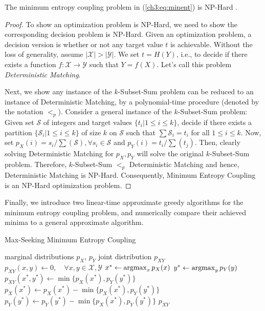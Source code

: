 \begin{remark} The minimum entropy coupling problem in (\ref{ch3:eq:minent}) is NP-Hard \cite{kovavcevic2015entropy}.
\end{remark}
\begin{proof}
To show an optimization problem is NP-Hard, we need to show the corresponding decision problem is NP-Hard.  Given an optimization problem, a decision version is whether or not any target value $t$ is achievable. Without the loss of generality, assume $|\mathcal{X}| > |\mathcal{Y}|$. We set $t=H(Y)$, i.e., to decide if there exists a function $f: \mathcal{X}\to\mathcal{Y}$ such that $Y=f(X)$. Let's call this problem \textit{Deterministic Matching}.

Next, we show any instance of the $k$-Subset-Sum problem can be reduced to an instance of Deterministic Matching, by a polynomial-time procedure (denoted by the notation $<_p$). Consider a general instance of the $k$-Subset-Sum problem: Given set $\mathcal{S}$ of integers and target values $\{t_i|1\leq i\leq k\}$, decide if there exists a partition $\{\mathcal{S}_i|1\leq i\leq k \}$ of size $k$ on $\mathcal{S}$ such that $\sum \mathcal{S}_i = t_i$ for all $1\leq i\leq k$. 
Now, set $p_X(i)=s_i/\sum(\mathcal{S}), \forall s_i \in \mathcal{S}$ and $p_Y(i)=t_i / \sum(t_j)$. Then, clearly solving Deterministic Matching for $p_X, p_Y$ will solve the original $k$-Subset-Sum problem. Therefore, $k$-Subset-Sum $<_p$ Deterministic Matching and hence, Deterministic Matching is NP-Hard. Consequently, Minimum Entropy Coupling is an NP-Hard optimization problem.
\end{proof}

Finally, we introduce two linear-time approximate greedy algorithms for the minimum entropy coupling problem, and numerically compare their achieved minima to a general approximate algorithm.

\vspace{0.5em}

\begin{algorithm}[H]
\caption{Max-Seeking Minimum Entropy Coupling}\label{ch3:alg:maxseekMEC}
\begin{algorithmic}[1]
    \Require marginal distributions $p_X$, $p_Y$
    \Ensure joint distribution $p_{XY}$
    \vspace{2pt}
    \State $p_{XY}(x, y) \gets 0, \quad \forall x, y \in \mathcal{X}, \mathcal{Y}$ 
        \State $x^* \gets \operatorname*{argmax}_{x} p_X(x)$ 
        \State $y^* \gets \operatorname*{argmax}_{y} p_Y(y)$ 
        \State $p_{XY}(x^*, y^*) \gets \min\{p_X(x^*), p_Y(y^*)\}$ 
        \State $p_X(x^*) \gets  p_X(x^*) - \min\{p_X(x^*), p_Y(y^*)\}$ 
        \State $p_Y(y^*) \gets  p_Y(y^*) - \min\{p_X(x^*), p_Y(y^*)\}$ 
    \EndWhile
    \State\Return $p_{XY}$
\end{algorithmic}
\end{algorithm}

